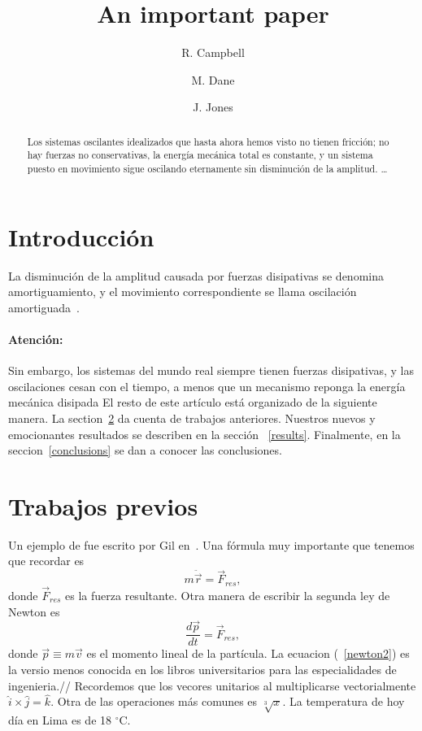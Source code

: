 \documentclass{article}
\title{An important paper}
\author[$1$]{R. Campbell}
\author[$2$]{M. Dane}
\author[$3$]{J. Jones}
\affil[$1$]{Department of Mathematics, Pennsylvania State University,Pittsburgh, Pennsylvania 13593}
\affil[$2$]{Atmospheric Research Station,
Pala Lundi, Fiji}
\affil[$3$]{Department of Philosophy, Freedman College,
Periwinkle, Colorado 84320}
\begin{document}
\maketitle

\begin{abstract}
Los sistemas oscilantes idealizados que hasta ahora hemos visto no tienen fricción; no hay fuerzas no conservativas, la energía mecánica total es constante, y un sistema puesto en movimiento sigue oscilando eternamente sin disminución de la amplitud. \ldots
\end{abstract}

\section{Introducci\'on}
La disminución de la amplitud causada por fuerzas disipativas se denomina amortiguamiento, y el movimiento correspondiente se llama oscilación amortiguada~\cite{sears}.

\paragraph{Atenci\'on:}
Sin embargo, los sistemas del mundo real siempre tienen fuerzas disipativas, y las oscilaciones cesan con el tiempo, a menos que un mecanismo reponga la energía mecánica disipada
El resto de este artículo está organizado de la siguiente manera.
La section~\ref{trabajos} da cuenta de trabajos anteriores.
Nuestros nuevos y emocionantes resultados se describen en la 
sección ~\ref{results}.
Finalmente, en la seccion~\ref{conclusions} se dan a conocer las conclusiones.

\section{Trabajos previos}\label{trabajos}
Un ejemplo de \LaTeXe{} fue escrito por Gil en~\cite{Gil:02}.
Una f\'ormula muy importante que tenemos que recordar es
\begin{equation}\label{newto1}
m \ddot{\vec{r}}=\vec{F}_{res},
\end{equation}
donde $\vec{F}_{res}$ es la fuerza resultante. Otra manera de escribir la segunda ley de Newton es
\begin{equation}\label{newton2}
\frac{d\vec{p}}{dt}=\vec{F}_{res},
\end{equation}
donde $\vec{p}\equiv m\vec{v}$ es el momento lineal de la part\'{i}cula. La ecuacion (~\ref{newton2}) es la versio menos conocida en los libros universitarios para las especialidades de ingenieria.//
Recordemos que los vecores unitarios al multiplicarse vectorialmente $\hat{i} \times \hat{j} =\hat{k} $.
Otra de las operaciones m\'as comunes es $\sqrt[3]{x}$. La temperatura de hoy d\'{i}a en Lima es de 18 $^{\circ}$C.
\end{document}
